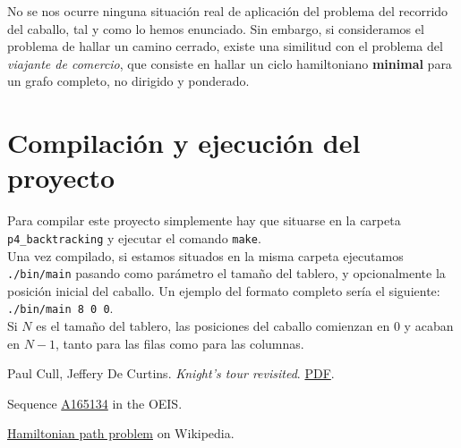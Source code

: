 \documentclass[11pt]{article}
\begin{document}
No se nos ocurre ninguna situación real de aplicación del problema del recorrido del caballo, tal y como lo hemos enunciado. Sin embargo, si consideramos el problema de hallar un camino cerrado, existe una similitud con el problema del \textit{viajante de comercio}, que consiste en hallar un ciclo hamiltoniano \textbf{minimal} para un grafo completo, no dirigido y ponderado.\\

\section*{Compilación y ejecución del proyecto}
Para compilar este proyecto simplemente hay que situarse en la carpeta \verb|p4_backtracking| y ejecutar el comando \verb|make|.\\

Una vez compilado, si estamos situados en la misma carpeta ejecutamos \verb|./bin/main| pasando como parámetro el tamaño del tablero, y opcionalmente la posición inicial del caballo. Un ejemplo del formato completo sería el siguiente: \verb|./bin/main 8 0 0|.\\

Si $N$ es el tamaño del tablero, las posiciones del caballo comienzan en $0$ y acaban en $N-1$, tanto para las filas como para las columnas.

\begin{thebibliography}{9}

  Paul Cull, Jeffery De Curtins.
  \emph{Knight's tour revisited}.
   \href{http://www.fq.math.ca/Scanned/16-3/cull.pdf}{PDF}.

  Sequence
  \href{https://oeis.org/A165134}{A165134} in the OEIS.

  \href{https://en.wikipedia.org/wiki/Hamiltonian_path_problem}{Hamiltonian path problem} on Wikipedia.

\end{thebibliography}
\end{document}
